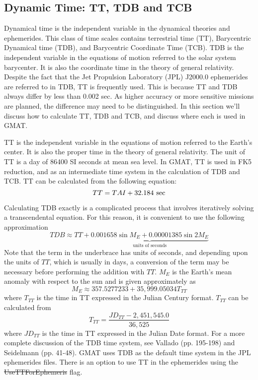 \subsection{Dynamic Time: TT, TDB and TCB}
\label{Sec:DynamicTime}

Dynamical time is the independent variable in the dynamical
theories and ephemerides. This class of time scales contains
terrestrial time (TT),  Barycentric Dynamical time (TDB), and
Barycentric Coordinate Time (TCB).    TDB is the independent
variable in the equations of motion referred to the solar system
barycenter. It is also the coordinate time in the theory of
general relativity. Despite the fact that the Jet Propulsion
Laboratory (JPL) J2000.0 ephemerides are referred to in TDB, TT is
frequently used. This is because TT and TDB always differ by less
than 0.002 sec. As higher accuracy or more sensitive missions are
planned, the difference may need to be distinguished.  In this
section we'll discuss how to calculate TT, TDB and TCB, and
discuss where each is used in GMAT.

TT is the independent variable in the equations of motion referred
to the Earth's center. It is also the proper time in the theory of
general relativity. The unit of TT is a day of 86400 SI seconds at
mean sea level.  In GMAT, TT is used in FK5 reduction, and as an
intermediate time system in the calculation of TDB and TCB.  TT
can be calculated from the following equation:
%
\begin{equation}
     TT = TAI + 32.184 \hspace{.05 in}\mbox{sec}
\end{equation}
%

Calculating TDB exactly is a complicated process that involves
iteratively solving a transcendental equation.  For this reason,
it is convenient to use the following approximation
%
\begin{equation}
     TDB \approx TT + \underbrace{0.001658\sin{M_E} +
     0.00001385\sin{2M_E}}_{\mbox{units of seconds}}
\end{equation}
%
Note that the term in the underbrace has units of seconds, and
depending upon the units of $TT$, which is usually in days, a
conversion of the term may be necessary before performing the
addition with $TT$. $M_E$ is the Earth's mean anomaly with respect
to the sun and is given approximately as
%
\begin{equation}
     M_E \approx 357.5277233 + 35,999.05034 T_{TT}
\end{equation}
%
where $T_{TT}$ is the time in TT expressed in the Julian Century
format.  $T_{TT}$ can be calculated from
%
\begin{equation}
     T_{TT} = \frac{JD_{TT} - 2,451,545.0}{36,525} \label{Eq:T_TTComputation}
\end{equation}
%
where $JD_{TT}$  is the time in TT expressed in the Julian Date
format.  For a more complete discussion of the TDB time system, see
Vallado\cite{vallado2} (pp. 195-198) and Seidelmann\cite{seidelmann}
(pp. 41-48).  GMAT uses TDB as the default time system in the JPL
ephemerides files. There is an option to use TT in the ephemerides
using the \st{UseTTForEphemeris} flag.

